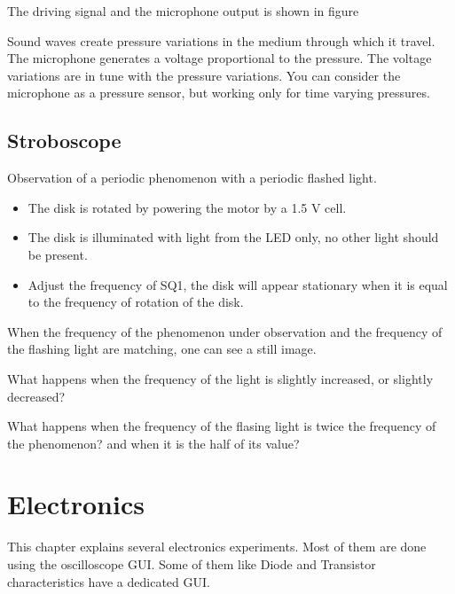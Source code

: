 \documentclass[a4paper,12pt,english]{sphinxmanual}
\let\sphinxpxdimen\pdfpxdimen\else\newdimen\sphinxpxdimen
\begin{document}
The driving signal and the microphone output is shown in figure

Sound waves create pressure variations in the medium through which it
travel. The microphone generates a voltage proportional to the pressure.
The voltage variations are in tune with the pressure variations. You can
consider the microphone as a pressure sensor, but working only for time
varying pressures.


\section{Stroboscope}
\label{\detokenize{2.17:stroboscope}}\label{\detokenize{2.17::doc}}

Observation of a periodic phenomenon with a periodic flashed light.


\noindent\sphinxincludegraphics[width=300\sphinxpxdimen]{{stroboscope}.pdf}
\begin{itemize}
\item {} 
The disk is rotated by powering the motor by a 1.5 V cell.

\item {} 
The disk is illuminated with light from the LED only, no other light
should be present.

\item {} 
Adjust the frequency of SQ1, the disk will appear stationary when it
is equal to the frequency of rotation of the disk.

\end{itemize}


When the frequency of the phenomenon under observation and the frequency
of the flashing light are matching, one can see a still image.

What happens when the frequency of the light is slightly increased, or slightly
decreased?

What happens when the frequency of the flasing light is twice the frequency
of the phenomenon? and when it is the half of its value?


\chapter{Electronics}
\label{\detokenize{index:electronics}}
This chapter explains several electronics experiments. Most of them are
done using the oscilloscope GUI. Some of them like Diode and Transistor
characteristics have a dedicated GUI.
\end{document}

